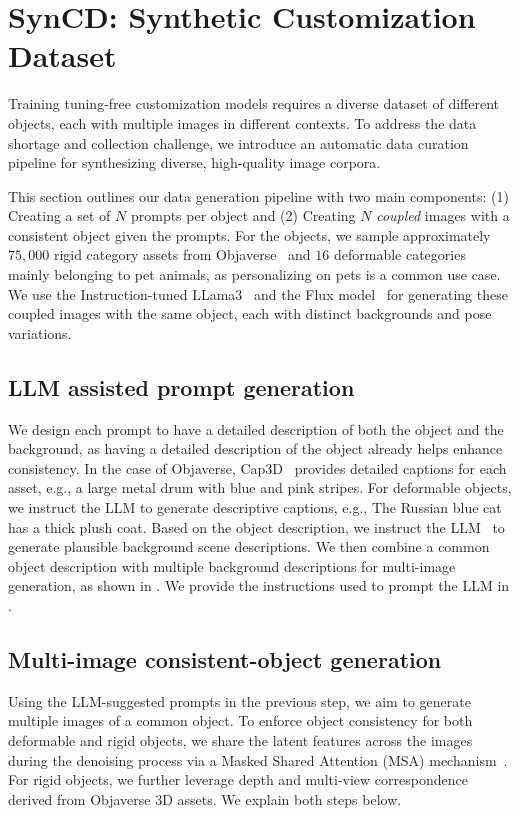 




\section{SynCD: Synthetic Customization Dataset}
Training tuning-free customization models requires a diverse dataset of different objects, each with multiple images in different contexts. 
To address the data shortage and collection challenge, we introduce an automatic data curation pipeline for synthesizing diverse, high-quality image corpora.

This section outlines our data generation pipeline with two main components: (1) Creating a set of $N$ prompts per object and (2) Creating $N$ \emph{coupled} images with a consistent object given the prompts. For the objects, we sample approximately $75, 000$ rigid category assets from Objaverse~\cite{deitke2023objaverse} and $16$ deformable categories mainly belonging to pet animals, as personalizing on pets is a common use case.
We use the Instruction-tuned LLama3~\cite{dubey2024llama} and the Flux model~\cite{flux} for generating these coupled images with the same object, each with distinct backgrounds and pose variations. 

\subsection{LLM assisted prompt generation}
We design each prompt to have a detailed description of both the object and the background, as having a detailed description of the object already helps enhance consistency. In the case of Objaverse, Cap3D~\cite{luo2024scalable} provides detailed captions for each asset, e.g., {\menlo a large metal drum with blue and pink stripes}. For deformable objects, we instruct the LLM to generate descriptive captions, e.g., {\menlo The Russian blue cat has a thick plush coat}. Based on the object description, we instruct the LLM~\cite{dubey2024llama} to generate plausible background scene descriptions. 
We then combine a common object description with multiple background descriptions for multi-image generation, as shown in . We provide the instructions used to prompt the LLM in . 

\subsection{Multi-image consistent-object generation} 
Using the LLM-suggested prompts in the previous step, we aim to generate multiple images of a common object. To enforce object consistency for both deformable and rigid objects, we share the latent features across the images during the denoising process via a Masked Shared Attention (MSA) mechanism~\cite{tewel2024training,shi2023zero123++}. For rigid objects, we further leverage depth and multi-view correspondence derived from Objaverse 3D assets. We explain both steps below.  


